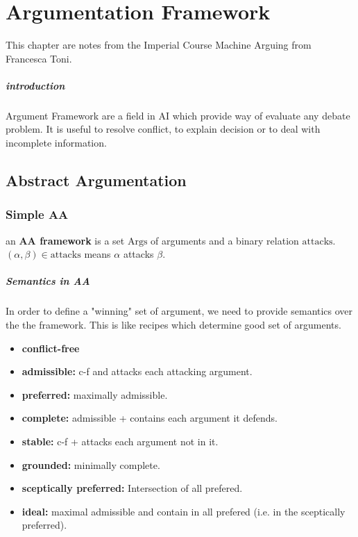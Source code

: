 \chapter{Argumentation Framework} %
\label{cha:argumentation_framework}

This chapter are notes from the Imperial Course Machine Arguing from Francesca Toni. 

\paragraph{introduction} %
\label{par:introduction}

	Argument Framework are a field in AI which provide way of evaluate any debate problem. It is useful to resolve conflict, to explain decision or to deal with incomplete information. 
\section{Abstract Argumentation}

	\subsection{Simple AA}

		\begin{definition}
		 		an  \textbf{AA framework} is a set $\mathrm{Args}$ of arguments and a binary relation $\mathrm{attacks}$. $(\alpha, \beta)\in \mathrm{attacks}$ means $\alpha$ attacks $\beta$.
		\end{definition} 

		\paragraph{Semantics in AA} 
			In order to define a "winning" set of argument, we need to provide semantics over the the framework. This is like recipes which determine good set of arguments. 

		\begin{definition}
			\begin{itemize}
				\item \textbf{conflict-free}
				\item \textbf{admissible:} c-f and attacks each attacking argument.
				\item \textbf{preferred:} maximally admissible.
				\item \textbf{complete:} admissible + contains each argument it defends.
				\item \textbf{stable:} c-f + attacks each argument not in it.
				\item \textbf{grounded:} minimally complete.
				\item \textbf{sceptically preferred:} Intersection of all prefered.
				\item \textbf{ideal:} maximal admissible and contain in all prefered (i.e. in the sceptically preferred).
			\end{itemize}
		\end{definition}

